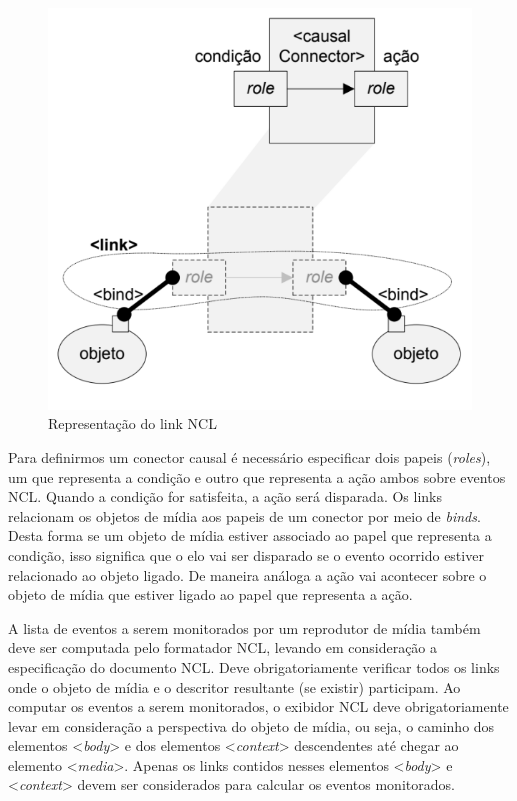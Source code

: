 \begin{figure}[!ht]
    \centering
    \includegraphics  [scale=0.4,keepaspectratio=true]{figuras/link.png}
    \caption{Representação do link NCL \cite{soares2009programando}}
    \label{fig:linkNCL}    
\end{figure}

Para definirmos um conector causal é necessário especificar dois papeis (\textit{roles}), um que representa a condição e outro que representa a ação ambos sobre eventos NCL. Quando a condição for satisfeita, a ação será disparada. Os links relacionam os objetos de mídia aos papeis de um conector por meio de \textit{binds}. Desta forma se um objeto de mídia estiver associado ao papel que representa a condição, isso significa que o elo vai ser disparado se o evento ocorrido estiver relacionado ao objeto ligado. De maneira análoga a ação vai acontecer sobre o objeto de mídia que estiver ligado ao papel que representa a ação.

A lista de eventos a serem monitorados por um reprodutor de mídia também deve ser computada pelo formatador NCL, levando em consideração a especificação do documento NCL. Deve obrigatoriamente verificar todos os links onde o objeto de mídia e o descritor resultante (se existir) participam. Ao computar os eventos a serem monitorados, o exibidor NCL deve obrigatoriamente levar em consideração a perspectiva do objeto de mídia, ou seja, o caminho dos elementos <\textit{body}> e dos elementos <\textit{context}> descendentes até chegar ao elemento <\textit{media}>. Apenas os links contidos nesses elementos <\textit{body}> e <\textit{context}> devem ser considerados para calcular os eventos monitorados.


